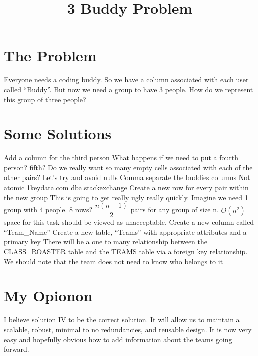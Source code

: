 \documentclass{article}
\title{3 Buddy Problem}
\begin{document}
\maketitle

\section{The Problem}
Everyone needs a coding buddy. So we have a column associated with each user called “Buddy”. But now we need a group to have 3 people. How do we represent this group of three people?

\section{Some Solutions}
\begin{outline}[enumerate]
    \1 Add a column for the third person
        \2 What happens if we need to put a fourth person? fifth?
        \2 Do we really want so many empty cells associated with each of the other pairs?
            \3 Let’s try and avoid nulls
    \1 Comma separate the buddies columns
        \2 Not atomic
            \3 \href{https://www.1keydata.com/database-normalization/first-normal-form-1nf.php#:~:text=An\%20atomic\%20value\%20is\%20a,columns\%20that\%20are\%20closely\%20related.}{1keydata.com}
            \3 \href{https://dba.stackexchange.com/questions/2342/what-is-atomic-relation-in-first-normal-form}{dba.stackexchange}
    \1 Create a new row for every pair within the new group
        \2 This is going to get really ugly really quickly. Imagine we need 1 group with 4 people. 8 rows?
        \2 $\dfrac{n(n-1)}{2}$ pairs for any group of size n.
        \2 $O(n^2)$ space for this task should be viewed as unacceptable.
    \1 Create a new column called “Team\_Name”
        \2 Create a new table, “Teams'' with appropriate attributes and a primary key
        \2 There will be a one to many relationship between the CLASS\_ROASTER table and the TEAMS table via a foreign key relationship.
        \2 We should note that the team does not need to know who belongs to it
\end{outline}

\section{My Opionon}  I believe solution IV to be the correct solution. It will allow us to maintain a scalable, robust, minimal to no redundancies, and reusable design. It is now very easy and hopefully obvious how to add information about the teams going forward.





  
\end{document}
